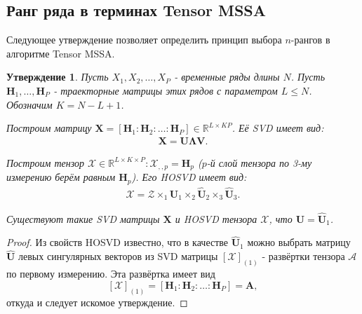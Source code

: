 \documentclass[11pt]{article}
\theoremstyle{plain}
\newtheorem{statement}{Утверждение}
\theoremstyle{definition}
\theoremstyle{remark}
\begin{document}
    \subsection{Ранг ряда в терминах Tensor MSSA}\label{subsec:tensor-mssa-rank}
    Следующее утверждение позволяет определить принцип выбора $n$-рангов в алгоритме Tensor MSSA.
    \begin{statement}
        Пусть $X_1, X_2, \ldots, X_P$ - временные ряды длины $N$.
        Пусть $\mathbf{H}_1, \ldots, \mathbf{H}_P$ - траекторные матрицы этих рядов с параметром $L \leqslant N$.
        Обозначим $K = N - L + 1$.

        Построим матрицу $\mathbf{X} = [\mathbf{H}_1: \mathbf{H}_2: \ldots: \mathbf{H}_P] \in
        \mathbb{R}^{L\times KP}$.
        Её \emph{SVD} имеет вид:
        \begin{gather}
            \mathbf{X} =\mathbf{U} \mathbf{\Lambda} \mathbf{V}.\label{mat-svd}
        \end{gather}

        Построим тензор $\mathcal{X} \in \mathbb{R}^{L\times K \times P}: \mathcal{X}_{,,p} = \mathbf{H}_p$
        ($p$-й слой тензора по 3-му измерению берём равным $\mathbf{H}_p$).
        Его \emph{HOSVD} имеет вид:
        \begin{gather}
            \mathcal{X}=\mathcal{Z} \times_1 \hat{\mathbf{U}}_1 \times_2 \hat{\mathbf{U}}_2 \times_3 \hat{\mathbf{U}}_3.\label{tens-hosvd}
        \end{gather}

        Существуют такие \emph{SVD} матрицы $\mathbf{X}$ и \emph{HOSVD} тензора $\mathcal{X}$, что
        $\mathbf{U} = \hat{\mathbf{U}}_1$.
    \end{statement}
    \begin{proof}
        Из свойств HOSVD известно, что в качестве $\hat{\mathbf{U}}_1$ можно выбрать матрицу $\hat{\mathbf{U}}$
        левых сингулярных векторов из SVD матрицы $[\mathcal{X}]_{(1)}$ -
        развёртки тензора $\mathcal{A}$ по первому измерению.
        Эта развёртка имеет вид
        \[
            [\mathcal{X}]_{(1)} = [\mathbf{H}_1: \mathbf{H}_2: \ldots: \mathbf{H}_P] = \mathbf{A},
        \]
        откуда и следует искомое утверждение.
    \end{proof}
\end{document}

